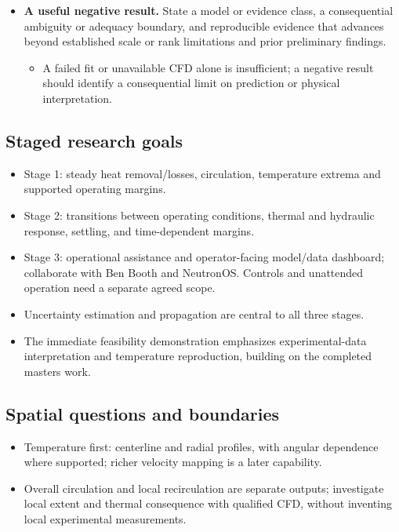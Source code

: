 \begin{itemize}[leftmargin=*]
\begin{itemize}
\item State which kind of contribution each work package would establish and what evidence separates it from implementation or a retrospective fit.
\end{itemize}
\item {}\textbf{A useful negative result.} State a model or evidence class, a consequential ambiguity or adequacy boundary, and reproducible evidence that advances beyond established scale or rank limitations and prior preliminary findings.
\begin{itemize}
\item A failed fit or unavailable CFD alone is insufficient; a negative result should identify a consequential limit on prediction or physical interpretation.
\end{itemize}
\end{itemize}

\subsection{Staged research goals}\label{subsec:staged-research-goals}

\begin{itemize}[leftmargin=*]
\item Stage 1: steady heat removal/\allowbreak{}losses, circulation, temperature extrema and supported operating margins.
\item Stage 2: transitions between operating conditions, thermal and hydraulic response, settling, and time-dependent margins.
\item Stage 3: operational assistance and operator-facing model/\allowbreak{}data dashboard; collaborate with Ben Booth and NeutronOS. Controls and unattended operation need a separate agreed scope.
\item Uncertainty estimation and propagation are central to all three stages.
\item The immediate feasibility demonstration emphasizes experimental-data interpretation and temperature reproduction, building on the completed master\textquotesingle{}s work.
\end{itemize}

\subsection{Spatial questions and boundaries}\label{subsec:spatial-questions-and-boundaries}
\begin{itemize}[leftmargin=*]
\item Temperature first: centerline and radial profiles, with angular dependence where supported; richer velocity mapping is a later capability.
\item Overall circulation and local recirculation are separate outputs; investigate local extent and thermal consequence with qualified CFD, without inventing local experimental measurements.
\end{itemize}
